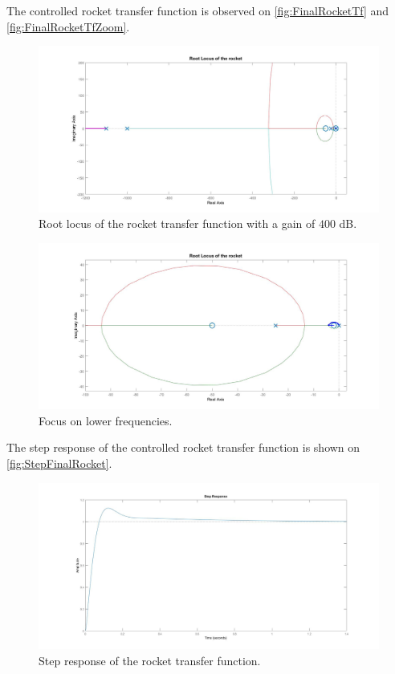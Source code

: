 The controlled rocket transfer function is observed on \autoref{fig:FinalRocketTf} and \autoref{fig:FinalRocketTfZoom}. 
\begin{figure}[htbp]
	\centering
	\includegraphics[width=\textwidth]{figures/Rocket/design/tf_with_controller_483}
	\caption{Root locus of the rocket transfer function with a gain of $400$ \si{\dB}.}
	\label{fig:FinalRocketTf}
\end{figure}

\begin{figure}[htbp]
	\centering
	\includegraphics[width=\textwidth]{figures/Rocket/design/tf_with_controller_483_zoom}
	\caption{Focus on lower frequencies.}
	\label{fig:FinalRocketTfZoom}
\end{figure}

The step response of the controlled rocket transfer function is shown on \autoref{fig:StepFinalRocket}.
\begin{figure}[htbp]
	\centering
	\includegraphics[width=\textwidth]{figures/Rocket/design/stepresponse_400}
	\caption{Step response of the rocket transfer function.}
	\label{fig:StepFinalRocket}
\end{figure}


